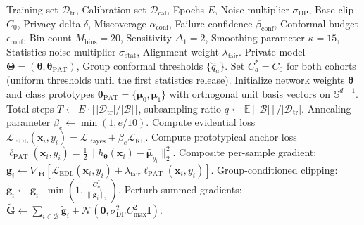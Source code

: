 \documentclass[3p,12pt]{elsarticle}
\theoremstyle{plain}
\theoremstyle{definition}
\begin{document}
\begin{algorithm}[t]
\caption{TRACER-Med Unified Training and Conformal Calibration Pipeline}
\label{alg:tracer}
\begin{algorithmic}[1]
\REQUIRE Training set $\mathcal{D}_{\text{tr}}$, Calibration set $\mathcal{D}_{\text{cal}}$, Epochs $E$, Noise multiplier $\sigma_{\text{DP}}$, Base clip $C_0$, Privacy delta $\delta$, Miscoverage $\alpha_{\text{conf}}$, Failure confidence $\beta_{\text{conf}}$, Conformal budget $\epsilon_{\text{conf}}$, Bin count $M_{\text{bins}} = 20$, Sensitivity $\Delta_1 = 2$, Smoothing parameter $\kappa = 15$, Statistics noise multiplier $\sigma_{\text{stat}}$, Alignment weight $\lambda_{\text{fair}}$.
\ENSURE Private model $\boldsymbol{\Theta} = (\boldsymbol{\theta}, \boldsymbol{\theta}_{\text{PAT}})$, Group conformal thresholds $\{\hat{q}_a\}$.
\STATE Set $C_a^* = C_0$ for both cohorts (uniform thresholds until the first statistics release).
\STATE Initialize network weights $\boldsymbol{\theta}$ and class prototypes $\boldsymbol{\theta}_{\text{PAT}} = \{\bar{\boldsymbol{\mu}}_0, \bar{\boldsymbol{\mu}}_1\}$ with orthogonal unit basis vectors on $\mathbb{S}^{d-1}$.
\STATE Total steps $T \leftarrow E \cdot \lceil |\mathcal{D}_{\text{tr}}| / |\mathcal{B}| \rceil$, subsampling ratio $q \leftarrow \mathbb{E}[|\mathcal{B}|] / |\mathcal{D}_{\text{tr}}|$.
    \STATE Annealing parameter $\beta_e \leftarrow \min(1, e/10)$.
            \STATE Compute evidential loss $\mathcal{L}_{\text{EDL}}(\mathbf{x}_i, y_i) = \mathcal{L}_{\text{Bayes}} + \beta_e \mathcal{L}_{\text{KL}}$.
            \STATE Compute prototypical anchor loss $\ell_{\text{PAT}}(\mathbf{x}_i, y_i) = \frac{1}{2} \|h_{\boldsymbol{\theta}}(\mathbf{x}_i) - \bar{\boldsymbol{\mu}}_{y_i}\|_2^2$.
            \STATE Composite per-sample gradient: $\mathbf{g}_i \leftarrow \nabla_{\boldsymbol{\Theta}} \left[\mathcal{L}_{\text{EDL}}(\mathbf{x}_i, y_i) + \lambda_{\text{fair}} \ell_{\text{PAT}}(\mathbf{x}_i, y_i)\right]$.
            \STATE Group-conditioned clipping: $\tilde{\mathbf{g}}_i \leftarrow \mathbf{g}_i \cdot \min\left(1, \frac{C_{a_i}^*}{\|\mathbf{g}_i\|_2}\right)$.
        \ENDFOR
        \STATE Perturb summed gradients: $\tilde{\mathbf{G}} \leftarrow \sum_{i \in \mathcal{B}} \tilde{\mathbf{g}}_i + \mathcal{N}\left(\mathbf{0}, \sigma_{\text{DP}}^2 C_{\max}^2 \mathbf{I}\right)$.

\end{algorithmic}
\end{algorithm}
\end{document}
